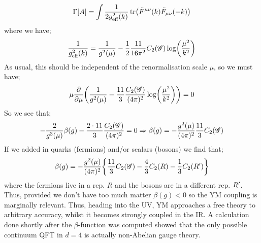\begin{equation*}
\Gamma[A] = \int{\frac{1}{2g^2_{\text{eff}}(k)}\tr\left(\tilde{F}^{\mu\nu}(k)\tilde{F}_{\mu\nu}(-k)\right)}
\end{equation*}
where we have;
\begin{equation}
\frac{1}{g^2_{\text{eff}}(k)} = \frac{1}{g^2(\mu)} - \frac{1}{2}\frac{11}{16\pi^2}C_2(\group)\log\left(\frac{\mu^2}{k^2}\right) 
\end{equation}
As usual, this should be independent of the renormalisation scale $\mu$, so we must have;
\begin{equation*}
\mu\frac{\del}{\del \mu}\left(\frac{1}{g^2(\mu)} - \frac{11}{3}\frac{C_2(\group)}{(4\pi)^2}\log\left(\frac{\mu^2}{k^2}\right)\right) = 0
\end{equation*}
So we see that;
\begin{equation*}
-\frac{2}{g^3(\mu)} \beta(g) - \frac{2 \cdot 11}{3}\frac{C_2(\mathscr{G})}{(4\pi)^2} = 0 \Rightarrow \beta(g) = - \frac{g^2(\mu)}{(4\pi)^2}\frac{11}{3}C_2(\mathscr{G})
\end{equation*}
If we added in quarks (fermions) and/or scalars (bosons) we find that;
\begin{equation*}
\beta(g) = -\frac{g^2(\mu)}{(4\pi)^2}\set{\frac{11}{3}C_2(\group) - \frac{4}{3}C_2(R) - \frac{1}{3}C_2(R\pr)}
\end{equation*}
where the fermions live in a rep. $R$ and the bosons are in a different rep. $R^{\prime}$. Thus, provided we don't have too much matter $\beta(g) < 0$ so the YM coupling is marginally relevant. Thus, heading into the UV, YM approaches a free theory to arbitrary accuracy, whilst it becomes strongly coupled in the IR. A calculation done shortly after the $\beta$-function was computed showed that the only possible continuum QFT in $d = 4$ is actually non-Abelian gauge theory.
















